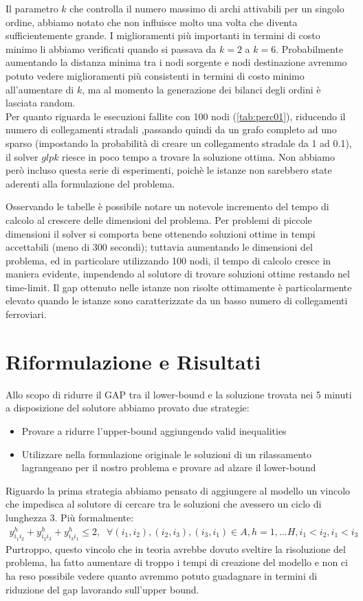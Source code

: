 \documentclass{article}
\begin{document}
Il parametro $k$ che controlla il numero massimo di archi attivabili per un singolo ordine, abbiamo notato che non influisce molto una volta che diventa sufficientemente grande. I miglioramenti più importanti in termini di costo minimo li abbiamo verificati quando si passava da $k = 2$ a $k = 6$. Probabilmente aumentando la distanza minima tra i nodi sorgente e nodi destinazione avremmo potuto vedere miglioramenti più consistenti in termini di costo minimo all'aumentare di $k$, ma al momento la generazione dei bilanci degli ordini è lasciata random.
\\
Per quanto riguarda le esecuzioni fallite con 100 nodi (\cref{tab:perc01}), riducendo il numero di collegamenti stradali ,passando quindi da un grafo completo ad uno sparso (impostando la probabilità di creare un collegamento stradale da 1 ad 0.1), il solver $glpk$ riesce in poco tempo a trovare la soluzione ottima. Non abbiamo però incluso questa serie di esperimenti, poichè le istanze non sarebbero state aderenti alla formulazione del problema.


Osservando le tabelle è possibile notare un notevole incremento del tempo di calcolo al crescere delle dimensioni del problema. Per problemi di piccole dimensioni il solver si comporta bene ottenendo soluzioni ottime in tempi accettabili (meno di 300 secondi); tuttavia aumentando le dimensioni del problema, ed in particolare utilizzando 100 nodi, il tempo di calcolo cresce in maniera evidente, impendendo al solutore di trovare soluzioni ottime restando nel time-limit. 
Il gap ottenuto nelle istanze non risolte ottimamente è particolarmente elevato quando le istanze sono caratterizzate da un basso numero di collegamenti ferroviari.


\section{Riformulazione e Risultati}

Allo scopo di ridurre il GAP tra il lower-bound e la soluzione trovata nei 5 minuti a disposizione del solutore abbiamo provato due strategie:
\begin{itemize}
    \item Provare a ridurre l'upper-bound aggiungendo valid inequalities
    \item Utilizzare nella formulazione originale le soluzioni di un rilassamento lagrangeano per il nostro problema e provare ad alzare il lower-bound
\end{itemize}
Riguardo la prima strategia abbiamo pensato di aggiungere al modello un vincolo che impedisca al solutore di cercare tra le soluzioni che avessero un ciclo di lunghezza 3. Più formalmente:
\begin{align}
    y_{i_{1}i_{2}}^h + y_{i_{2}i_{3}}^h + y_{i_{3}i_{1}}^h \leq 2, \; \;
    \forall (i_1,i_2), (i_2,i_3), (i_3,i_1)   \in A , h=1, ... H,
    i_1 < i_2, i_1 < i_3
\end{align}
Purtroppo, questo vincolo che in teoria avrebbe dovuto sveltire la risoluzione del problema, ha fatto aumentare di troppo i tempi di creazione del modello e non ci ha reso possibile vedere quanto avremmo potuto guadagnare in termini di riduzione del gap lavorando sull'upper bound.
\end{document}
